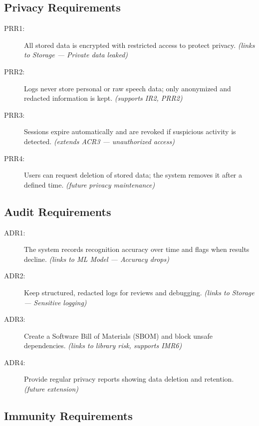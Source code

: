 \documentclass[11pt]{article}
\begin{document}
\subsection{Privacy Requirements}\label{req:SEC3}

\begin{description}
  \item[PRR1:] All stored data is encrypted with restricted access to protect privacy. \emph{(links to Storage — Private data leaked)}
  \item[PRR2:] Logs never store personal or raw speech data; only anonymized and redacted information is kept. \emph{(supports IR2, PRR2)}
  \item[PRR3:] Sessions expire automatically and are revoked if suspicious activity is detected. \emph{(extends ACR3 — unauthorized access)}
  \item[PRR4:] Users can request deletion of stored data; the system removes it after a defined time. \emph{(future privacy maintenance)}
\end{description}

\subsection{Audit Requirements}\label{req:SEC4}

\begin{description}
  \item[ADR1:] The system records recognition accuracy over time and flags when results decline. \emph{(links to ML Model — Accuracy drops)}
  \item[ADR2:] Keep structured, redacted logs for reviews and debugging. \emph{(links to Storage — Sensitive logging)}
  \item[ADR3:] Create a Software Bill of Materials (SBOM) and block unsafe dependencies. \emph{(links to library risk, supports IMR6)}
  \item[ADR4:] Provide regular privacy reports showing data deletion and retention. \emph{(future extension)}
\end{description}

\subsection{Immunity Requirements}\label{req:SEC5}
\end{document}
